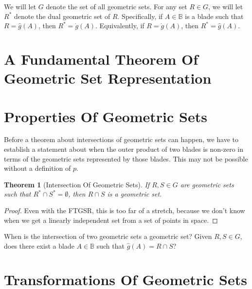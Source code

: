 \documentclass{birkjour}
\newtheorem{thm}{Theorem}[section]
\theoremstyle{definition}
\theoremstyle{remark}
\numberwithin{equation}{section}
\newcommand{\B}{\mathbb{B}}
\newcommand{\gd}{\dot{g}}
\newcommand{\gh}{\hat{g}}
\begin{document}
We will let $G$ denote the set of all geometric sets.  For any set $R\in G$, we will let $R^*$ denote the dual geometric
set of $R$.  Specifically, if $A\in\B$ is a blade such that $R=\gh(A)$, then $R^*=\gd(A)$.  Equivalently, if $R=\gd(A)$, then $R^*=\gh(A)$.

\section{A Fundamental Theorem Of Geometric Set Representation}


\section{Properties Of Geometric Sets}

Before a theorem about intersections of geometric sets can happen, we have to establish a statement
about when the outer product of two blades is non-zero in terms of the geometric sets represented by
those blades.  This may not be possible without a definition of $p$.

\begin{thm}[Intersection Of Geometric Sets]
If $R,S\in G$ are geometric sets such that $R^*\cap S^*=\emptyset$,
then $R\cap S$ is a geometric set.
\end{thm}
\begin{proof}
Even with the FTGSR, this is too far of a stretch, because we don't know when we get a linearly
independent set from a set of points in space.
\end{proof}

When is the intersection of two geometric sets a geometric set?  Given $R,S\in G$, does there
exist a blade $A\in\B$ such that $\gh(A)=R\cap S$?



\section{Transformations Of Geometric Sets}

\end{document}
